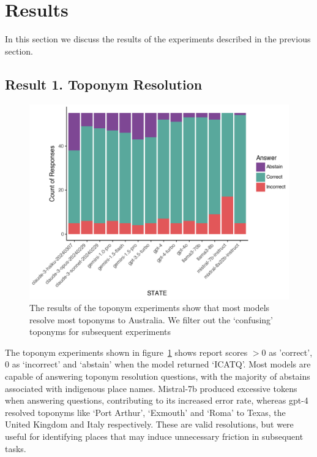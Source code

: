 \section{Results}
\label{section:results}

In this section we discuss the results of the experiments described in the previous section.



\subsection{Result 1. Toponym Resolution}

\begin{figure}
    \centering
    \includegraphics[width=\columnwidth]{figures/toponym_bar_state}
    \caption{The results of the toponym experiments show that most models resolve most toponyms to Australia. We filter out the `confusing' toponyms for subsequent experiments}
    \label{fig:toponym}
\end{figure}

The toponym experiments shown in figure~\ref{fig:toponym} shows report scores $>0$ as 'correct', $0$ as `incorrect' and `abstain' when the model returned `ICATQ'. 
Most models are capable of answering toponym resolution questions, with the majority of abstains associated with indigenous place names. 
Mistral-7b produced excessive tokens when answering questions, contributing to its increased error rate, whereas gpt-4 resolved toponyms like `Port Arthur', `Exmouth' and `Roma' to Texas, the United Kingdom and Italy respectively.
These are valid resolutions, but were useful for identifying places that may induce unnecessary friction in subsequent tasks.

